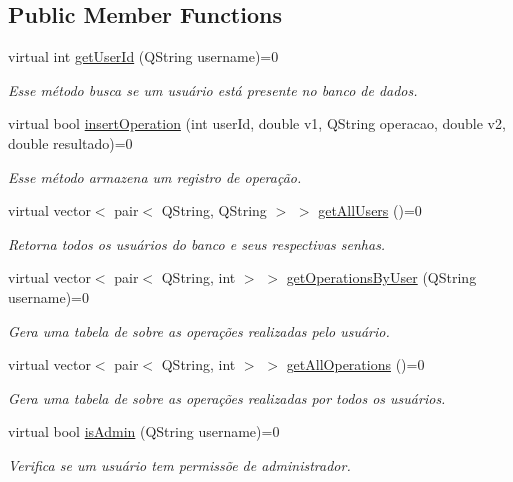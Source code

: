 \subsection*{Public Member Functions}
\begin{DoxyCompactItemize}
\item 
virtual int \hyperlink{classDatabaseHelper_a03e499b83f152466abed94fef2f0ef73}{get\+User\+Id} (Q\+String username)=0
\begin{DoxyCompactList}\small\item\em Esse método busca se um usuário está presente no banco de dados. \end{DoxyCompactList}\item 
virtual bool \hyperlink{classDatabaseHelper_aaff1d6157ea2d4fa7edb6744e8ce7daf}{insert\+Operation} (int user\+Id, double v1, Q\+String operacao, double v2, double resultado)=0
\begin{DoxyCompactList}\small\item\em Esse método armazena um registro de operação. \end{DoxyCompactList}\item 
virtual vector$<$ pair$<$ Q\+String, Q\+String $>$ $>$ \hyperlink{classDatabaseHelper_a32fe64f07291bbefc59e92690b7017bf}{get\+All\+Users} ()=0
\begin{DoxyCompactList}\small\item\em Retorna todos os usuários do banco e seus respectivas senhas. \end{DoxyCompactList}\item 
virtual vector$<$ pair$<$ Q\+String, int $>$ $>$ \hyperlink{classDatabaseHelper_ae9b9e741f7a776348dd334de3fa7e52b}{get\+Operations\+By\+User} (Q\+String username)=0
\begin{DoxyCompactList}\small\item\em Gera uma tabela de sobre as operações realizadas pelo usuário. \end{DoxyCompactList}\item 
virtual vector$<$ pair$<$ Q\+String, int $>$ $>$ \hyperlink{classDatabaseHelper_adc20c023d6dd87602bfd3310bddcf6d1}{get\+All\+Operations} ()=0
\begin{DoxyCompactList}\small\item\em Gera uma tabela de sobre as operações realizadas por todos os usuários. \end{DoxyCompactList}\item 
virtual bool \hyperlink{classDatabaseHelper_aca0024be103d394caf3a6eef7899c714}{is\+Admin} (Q\+String username)=0
\begin{DoxyCompactList}\small\item\em Verifica se um usuário tem permissõe de administrador. \end{DoxyCompactList}\end{DoxyCompactItemize}



